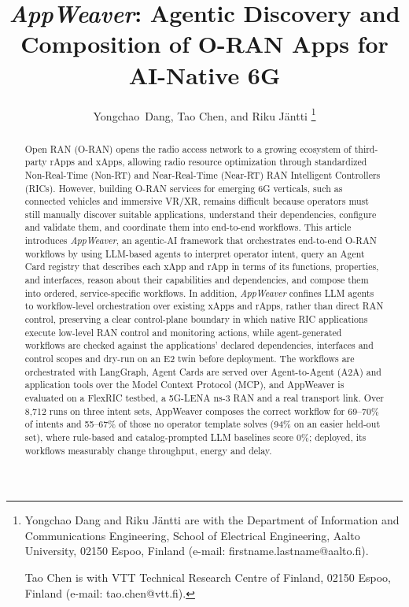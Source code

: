 \documentclass[conference]{IEEEtran}
\begin{document}
\title{\emph{AppWeaver}: Agentic Discovery and Composition of O-RAN Apps for AI-Native 6G}

\author{Yongchao~Dang,
        Tao Chen, 
        and  Riku Jäntti
\thanks{
Yongchao Dang and Riku Jäntti are with the Department of Information and Communications Engineering, School of Electrical Engineering, Aalto University, 02150 Espoo, Finland (e-mail: firstname.lastname@aalto.fi).

Tao Chen is with VTT Technical Research Centre of Finland, 02150 Espoo, Finland (e-mail: tao.chen@vtt.fi).
}
}

\maketitle



\begin{abstract}
Open RAN (O-RAN) opens the radio access network to a growing ecosystem of third-party rApps and xApps, allowing radio resource optimization through standardized Non-Real-Time (Non-RT) and Near-Real-Time (Near-RT) RAN Intelligent Controllers (RICs). However, building O-RAN services for emerging 6G verticals, such as connected vehicles and immersive VR/XR, remains difficult because operators must still manually discover suitable applications, understand their dependencies, configure and validate them, and coordinate them into end-to-end workflows. This article introduces \emph{AppWeaver}, an agentic-AI framework that orchestrates end-to-end O-RAN workflows by using LLM-based agents to interpret operator intent, query an Agent Card registry that describes each xApp and rApp in terms of its functions, properties, and interfaces, reason about their capabilities and dependencies, and compose them into ordered, service-specific workflows. In addition, \emph{AppWeaver} confines LLM agents to workflow-level orchestration over existing xApps and rApps, rather than direct RAN control, preserving a clear control-plane boundary in which native RIC applications execute low-level RAN control and monitoring actions, while agent-generated workflows are checked against the applications' declared dependencies, interfaces and control scopes and dry-run on an E2 twin before deployment. The workflows are orchestrated with LangGraph, Agent Cards are served over Agent-to-Agent (A2A) and application tools over the Model Context Protocol (MCP), and AppWeaver is evaluated on a FlexRIC testbed, a 5G-LENA ns-3 RAN and a real transport link. Over 8,712 runs on three intent sets, AppWeaver composes the correct workflow for 69--70\% of intents and 55--67\% of those no operator template solves (94\% on an easier held-out set), where rule-based and catalog-prompted LLM baselines score 0\%; deployed, its workflows measurably change throughput, energy and delay.
\end{abstract}
\end{document}
